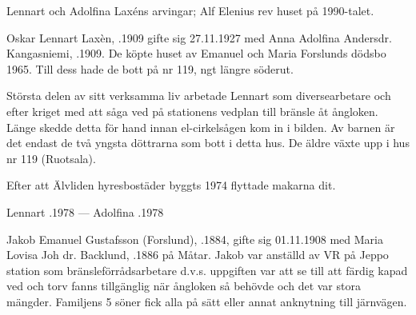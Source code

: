 %
Lennart och Adolfina Laxéns arvingar; Alf Elenius rev huset på 1990-talet.\jhvspace{}



%
Oskar Lennart Laxèn, .1909 gifte sig 27.11.1927 med Anna Adolfina Andersdr. Kangasniemi, .1909. De köpte huset av Emanuel och Maria Forslunds dödsbo 1965. Till dess hade de bott på nr 119, ngt längre söderut.

Största delen av sitt verksamma liv arbetade Lennart som diversearbetare och efter kriget med att såga ved på stationens vedplan till bränsle åt ångloken. Länge skedde detta för hand innan el-cirkelsågen kom in i bilden. Av barnen är det endast de två yngsta döttrarna som bott i detta hus. De äldre växte upp i hus nr 119 (Ruotsala).
\begin{jhchildren}
  \item {}
  \item {}
  \item {}
  \item {}
  \item {}
  \item {}
  \item {}
\end{jhchildren}

Efter att Älvliden hyresbostäder byggts 1974 flyttade makarna dit.

Lennart .1978  ---  Adolfina .1978


%
Jakob Emanuel Gustafsson (Forslund), .1884, gifte sig 01.11.1908 med Maria Lovisa Joh dr. Backlund,  .1886 på Måtar. Jakob var anställd av VR på Jeppo station som bränsleförrådsarbetare d.v.s. uppgiften var att se till att färdig kapad ved och torv fanns tillgänglig när ångloken så behövde och det var stora mängder. Familjens 5 söner fick alla på sätt eller annat anknytning till järnvägen.

